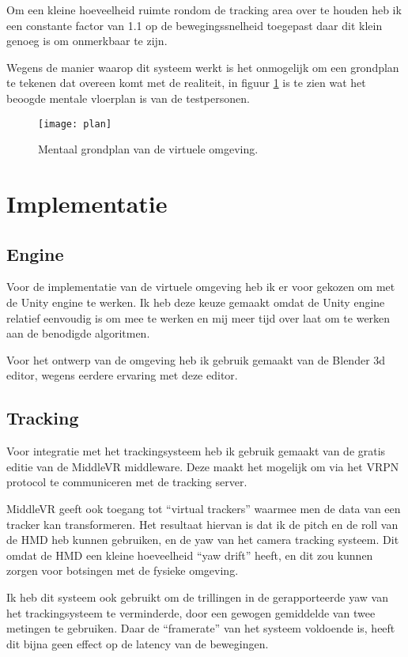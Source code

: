 Om een kleine hoeveelheid ruimte rondom de tracking area over te houden heb ik
een constante factor van 1.1 op de bewegingssnelheid toegepast daar dit klein 
genoeg is om onmerkbaar te zijn\cite{steinicke09}.

Wegens de manier waarop dit systeem werkt is het onmogelijk om een grondplan te
tekenen dat overeen komt met de realiteit, in figuur \ref{fig:plan} is te zien
wat het beoogde mentale vloerplan is van de testpersonen.

\begin{figure}[p]
    \centering
    \texttt{[image: plan]}
    \caption{Mentaal grondplan van de virtuele omgeving.}
    \label{fig:plan}
\end{figure}


\section{Implementatie}
\subsection{Engine}
Voor de implementatie van de virtuele omgeving heb ik er voor gekozen om met de
Unity engine te werken. Ik heb deze keuze gemaakt omdat de Unity engine relatief
eenvoudig is om mee te werken en mij meer tijd over laat om te werken aan de
benodigde algoritmen.

Voor het ontwerp van de omgeving heb ik gebruik gemaakt van de Blender 3d
editor, wegens eerdere ervaring met deze editor.

\subsection{Tracking}
Voor integratie met het trackingsysteem heb ik gebruik gemaakt van de gratis
editie van de MiddleVR middleware. Deze maakt het mogelijk om via het VRPN
protocol te communiceren met de tracking server.

MiddleVR geeft ook toegang tot ``virtual trackers'' waarmee men de data van een
tracker kan transformeren. Het resultaat hiervan is dat ik de pitch en de roll
van de HMD heb kunnen gebruiken, en de yaw van het camera tracking systeem. Dit
omdat de HMD een kleine hoeveelheid ``yaw drift'' heeft, en dit zou kunnen zorgen
voor botsingen met de fysieke omgeving.

Ik heb dit systeem ook gebruikt om de trillingen in de gerapporteerde yaw van het
trackingsysteem te verminderde, door een gewogen gemiddelde van twee metingen te
gebruiken. Daar de ``framerate'' van het systeem voldoende is, heeft dit bijna 
geen effect op de latency van de bewegingen.

